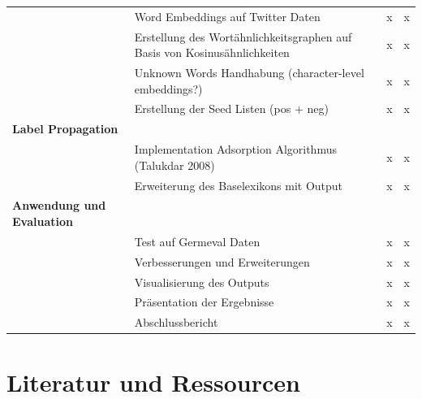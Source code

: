 \documentclass{beamer}
\begin{document}
\begin{frame}[plain, t]
\begin{table}[]
{\begin{tabular}{llll}
 & Word Embeddings auf Twitter Daten & x & x \\
 & Erstellung des Wortähnlichkeitsgraphen auf Basis von Kosinusähnlichkeiten & x & x \\
 & Unknown Words Handhabung (character-level embeddings?) & x & x \\
 & Erstellung der Seed Listen (pos + neg) & x & x \\
\bf{Label Propagation} &  &  &  \\
 & Implementation Adsorption Algorithmus (Talukdar 2008) & x & x \\
 & Erweiterung des Baselexikons mit Output & x & x \\
\bf{Anwendung und Evaluation} &  &  &  \\
 & Test auf Germeval Daten & x & x \\
 & Verbesserungen und Erweiterungen & x & x \\
 & Visualisierung des Outputs & x & x \\
 & Präsentation der Ergebnisse & x & x \\
 & Abschlussbericht & x & x
\end{tabular}%
}
\end{table}
\end{frame}

%
%
%
%




\section{Literatur und Ressourcen}
\end{document}

